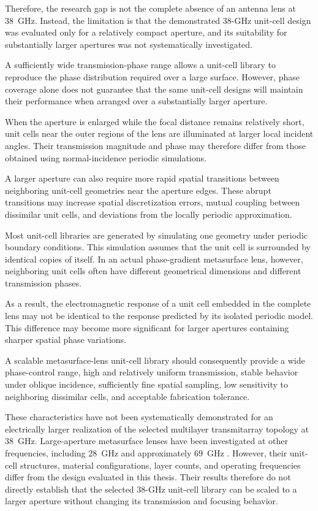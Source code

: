 Therefore, the research gap is not the complete absence of an antenna
lens at 38~GHz. Instead, the limitation is that the demonstrated
38-GHz unit-cell design was evaluated only for a relatively compact
aperture, and its suitability for substantially larger apertures was
not systematically investigated.

A sufficiently wide transmission-phase range allows a unit-cell
library to reproduce the phase distribution required over a large
surface. However, phase coverage alone does not guarantee that the
same unit-cell designs will maintain their performance when arranged
over a substantially larger aperture.

When the aperture is enlarged while the focal distance remains
relatively short, unit cells near the outer regions of the lens are
illuminated at larger local incident angles. Their transmission
magnitude and phase may therefore differ from those obtained using
normal-incidence periodic simulations.

A larger aperture can also require more rapid spatial transitions
between neighboring unit-cell geometries near the aperture edges.
These abrupt transitions may increase spatial discretization errors,
mutual coupling between dissimilar unit cells, and deviations from the
locally periodic approximation.

Most unit-cell libraries are generated by simulating one geometry
under periodic boundary conditions. This simulation assumes that the
unit cell is surrounded by identical copies of itself. In an actual
phase-gradient metasurface lens, however, neighboring unit cells
often have different geometrical dimensions and different
transmission phases.

As a result, the electromagnetic response of a unit cell embedded in
the complete lens may not be identical to the response predicted by
its isolated periodic model. This difference may become more
significant for larger apertures containing sharper spatial phase
variations.

A scalable metasurface-lens unit-cell library should consequently
provide a wide phase-control range, high and relatively uniform
transmission, stable behavior under oblique incidence, sufficiently
fine spatial sampling, low sensitivity to neighboring dissimilar
cells, and acceptable fabrication tolerance.

These characteristics have not been systematically demonstrated for
an electrically larger realization of the selected multilayer
transmitarray topology at 38~GHz. Large-aperture metasurface lenses
have been investigated at other frequencies, including 28~GHz and
approximately 69~GHz \cite{Lee2022Large,Bagheri2023}. However, their
unit-cell structures, material configurations, layer counts, and
operating frequencies differ from the design evaluated in this
thesis. Their results therefore do not directly establish that the
selected 38-GHz unit-cell library can be scaled to a larger aperture
without changing its transmission and focusing behavior.

